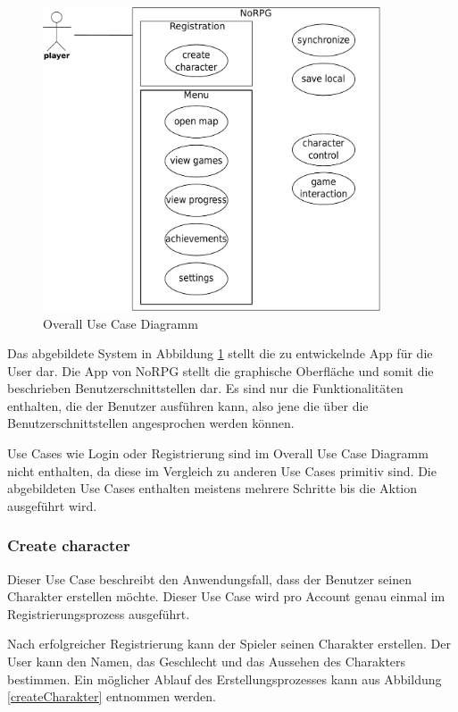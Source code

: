 		\begin{figure}[htbp]
			\centering 
			\label{oucd}
			\includegraphics[width=10cm]{pics/OUCD.pdf}
			\caption{Overall Use Case Diagramm}
		\end{figure}
		
		Das abgebildete System in Abbildung \ref{oucd} stellt die zu entwickelnde App für die User dar. Die App von NoRPG stellt die graphische Oberfläche und somit die beschrieben Benutzerschnittstellen dar. Es sind nur die Funktionalitäten enthalten, die der Benutzer ausführen kann, also jene die über die Benutzerschnittstellen angesprochen werden können. 
		
		Use Cases wie Login oder Registrierung sind im Overall Use Case Diagramm nicht enthalten, da diese im Vergleich zu anderen Use Cases primitiv sind. Die abgebildeten Use Cases enthalten meistens mehrere Schritte bis die Aktion ausgeführt wird.
	
		\subsubsection{Create character}
			Dieser Use Case beschreibt den Anwendungsfall, dass der Benutzer seinen Charakter erstellen möchte. Dieser Use Case wird pro Account genau einmal im Registrierungsprozess ausgeführt.
			
			Nach erfolgreicher Registrierung kann der Spieler seinen Charakter erstellen. Der User kann den Namen, das Geschlecht und das Aussehen des Charakters bestimmen. Ein möglicher Ablauf des Erstellungsprozesses kann aus Abbildung \ref{createCharakter} entnommen werden.
			
